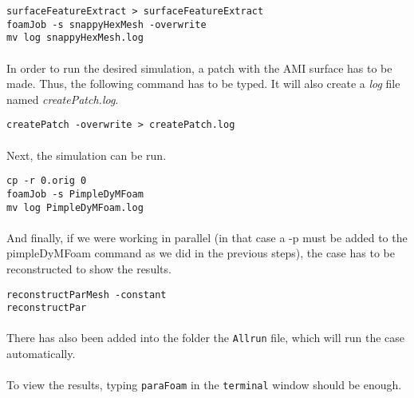 \begin{center}
\texttt{surfaceFeatureExtract > surfaceFeatureExtract \\
foamJob -s snappyHexMesh -overwrite\\
mv log snappyHexMesh.log }
\end{center}

\paragraph{}In order to run the desired simulation, a patch with the AMI surface has to be made. Thus, the following command has to be typed. It will also create a \textit{log} file named \textit{createPatch.log}.

\begin{center}
\texttt{createPatch -overwrite > createPatch.log}
\end{center}

\paragraph{}Next, the simulation can be run.

\begin{center}
\texttt{cp -r 0.orig 0\\
foamJob -s PimpleDyMFoam\\
mv log PimpleDyMFoam.log}
\end{center}

\paragraph{}And finally, if we were working in parallel (in that case a -p must be added to the pimpleDyMFoam command as we did in the previous steps), the case has to be reconstructed to show the results.

\begin{center}
\texttt{reconstructParMesh -constant\\
reconstructPar}
\end{center}

\paragraph{}There has also been added into the folder the \texttt{Allrun} file, which will run the case automatically.

\paragraph{}To view the results, typing \texttt{paraFoam} in the \texttt{terminal} window should be enough.